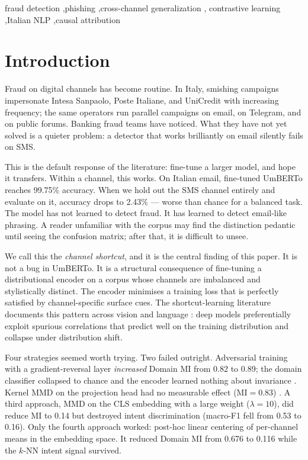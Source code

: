\documentclass[preprint,12pt,authoryear]{elsarticle}
\begin{document}
\begin{frontmatter}
\begin{keyword}
fraud detection \sep phishing \sep cross-channel generalization \sep
contrastive learning \sep Italian NLP \sep causal attribution
\end{keyword}

\end{frontmatter}

\section{Introduction}
\label{sec:intro}

Fraud on digital channels has become routine. In Italy, smishing
campaigns impersonate Intesa Sanpaolo, Poste Italiane, and UniCredit
with increasing frequency; the same operators run parallel campaigns
on email, on Telegram, and on public forums. Banking fraud teams have
noticed. What they have not yet solved is a quieter problem: a
detector that works brilliantly on email silently fails on SMS.

This is the default response of the literature: fine-tune a larger
model, and hope it transfers. Within a channel, this works. On
Italian email, fine-tuned UmBERTo reaches 99.75\% accuracy. When we
hold out the SMS channel entirely and evaluate on it, accuracy drops
to 2.43\% --- worse than chance for a balanced task. The model has
not learned to detect fraud. It has learned to detect email-like
phrasing. A reader unfamiliar with the corpus may find the
distinction pedantic until seeing the confusion matrix; after that,
it is difficult to unsee.

We call this the \emph{channel shortcut}, and it is the central
finding of this paper. It is not a bug in UmBERTo. It is a
structural consequence of fine-tuning a distributional encoder on a
corpus whose channels are imbalanced and stylistically distinct. The
encoder minimises a training loss that is perfectly satisfied by
channel-specific surface cues. The shortcut-learning literature
documents this pattern across vision and language
\citep{geirhos2020shortcut,mccoy2019right}: deep models
preferentially exploit spurious correlations that predict well on the
training distribution and collapse under distribution shift.

Four strategies seemed worth trying. Two failed outright.
Adversarial training with a gradient-reversal layer \emph{increased}
Domain MI from 0.82 to 0.89; the domain classifier collapsed to
chance and the encoder learned nothing about invariance
\citep{ganin2016domain}. Kernel MMD on the projection head had no
measurable effect ($\text{MI}=0.83$) \citep{gretton2012mmd}. A third
approach, MMD on the CLS embedding with a large weight
($\lambda=10$), did reduce MI to 0.14 but destroyed intent
discrimination (macro-F1 fell from 0.53 to 0.16). Only the fourth
approach worked: post-hoc linear centering of per-channel means in
the embedding space. It reduced Domain MI from 0.676 to 0.116 while
the $k$-NN intent signal survived.
\end{document}
